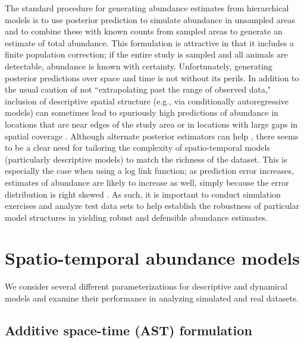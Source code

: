 \documentclass[12pt,english]{article}
\begin{document}
\begin{spacing}{1.9}
The standard procedure for generating abundance estimates from hierarchical models is to use posterior prediction to simulate abundance in unsampled areas and to combine these with known counts from sampled areas \citep{VerHoef2008,JohnsonEtAl2010} to generate an estimate of total abundance.  This formulation is attractive in that it includes a finite population correction; if the entire study is sampled and all animals are detectable, abundance is known with certainty.  Unfortunately, generating posterior predictions over space and time is not without its perils.  In addition to the usual caution of not ``extrapolating past the range of observed data," inclusion of descriptive spatial structure (e.g., via conditionally autoregressive models) can sometimes lead to spuriously high predictions of abundance in locations that are near edges of the study area \citep[edge effects;][]{VerHoefJansen2007} or in locations with large gaps in spatial coverage \citep{ConnEtAl2014}.  Although alternate posterior estimators can help \citep[e.g., the Varian predictor induced by the linex loss function;][]{VerHoefJansen2007}, there seems to be a clear need for tailoring the complexity of spatio-temporal models (particularly descriptive models) to match the richness of the dataset.  This is especially the case when using a log link function; as prediction error increases, estimates of abundance are likely to increase as well, simply because the error distribution is right skewed \citep{VerHoef2008}.  As such, it is important to conduct simulation exercises and analyze test data sets to help establish the robustness of particular model structures in yielding robust and defensible abundance estimates.

\section{Spatio-temporal abundance models}

We consider several different parameterizations for descriptive and dynamical models and examine their performance
in analyzing simulated and real datasets.

\subsection{Additive space-time (AST) formulation}


\end{spacing}
\end{document}
